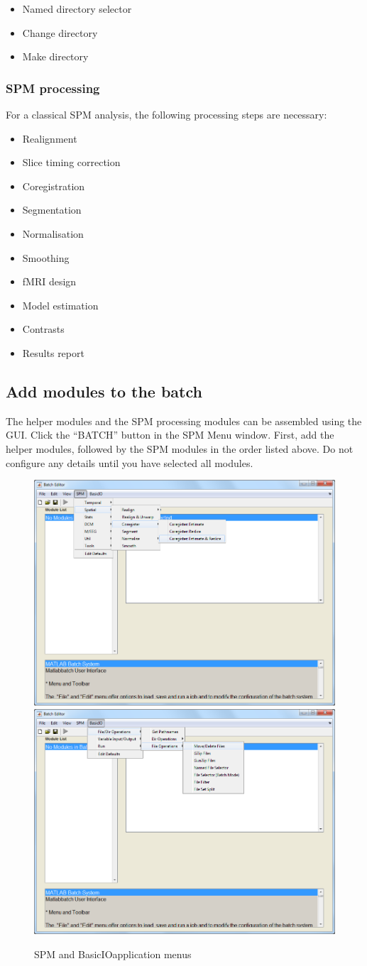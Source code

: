 \begin{itemize}
\item Named directory selector
\item Change directory
\item Make directory
\end{itemize}

\subsubsection{SPM processing}

For a classical SPM analysis, the following processing steps are necessary:

\begin{itemize}
\item Realignment
\item Slice timing correction
\item Coregistration
\item Segmentation
\item Normalisation
\item Smoothing
\item fMRI design
\item Model estimation
\item Contrasts
\item Results report
\end{itemize}

\subsection{Add modules to the batch}

The helper modules and the SPM processing modules can be assembled using the
GUI. Click the ``BATCH'' button in the SPM Menu window. First, add the helper
modules, followed by the SPM modules in the order listed above. Do not configure
any details until you have selected all modules.

\begin{figure}
  \centering
  \includegraphics[width=.49\linewidth]{batch/batch_spm}
  \hfill
  \includegraphics[width=.49\linewidth]{batch/batch_basicio}      
  \caption{SPM and BasicIOapplication menus}
  \label{fig:basicio_spm}
\end{figure}

